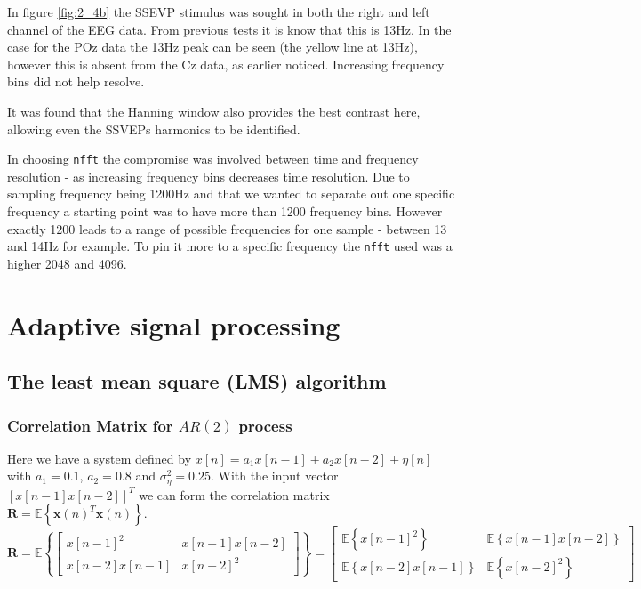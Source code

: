 \documentclass[10pt,twoside,a4paper]{report}
\begin{document}
In figure \ref{fig:2_4b} the SSEVP stimulus was sought in both the right and left channel of the EEG data. From previous tests it is know that this is 13Hz. In the case for the POz data the 13Hz peak can be seen (the yellow line at 13Hz), however this is absent from the Cz data, as earlier noticed. Increasing frequency bins did not help resolve.

It was found that the Hanning window also provides the best contrast here, allowing even the SSVEPs harmonics to be identified.

In choosing \texttt{nfft} the compromise was involved between time and frequency resolution - as increasing frequency bins decreases time resolution. Due to sampling frequency being 1200Hz and that we wanted to separate out one specific frequency a starting point was to have more than 1200 frequency bins. However exactly 1200 leads to a range of possible frequencies for one sample - between 13 and 14Hz for example. To pin it more to a specific frequency the \texttt{nfft} used was a higher 2048 and 4096.
\FloatBarrier
\chapter{Adaptive signal processing}
\section{The least mean square (LMS) algorithm}
\subsection{Correlation Matrix for $AR(2)$ process}


Here we have a system defined by $x[n] = a_1 x[n-1] + a_2 x[n-2] + \eta [n]$ with $a_1 = 0.1$, $a_2 = 0.8$ and $\sigma_\eta^2=0.25$. With the input vector $ \left[ x[n-1]  x[n-2]\right]^T$ we can form the correlation matrix $\mathbf{R} = \mathbb{E}\left\{ \mathbf{x}(n)^T \mathbf{x}(n) \right\}$.
\begin{equation}
\mathbf{R} = \mathbb{E} \left\{ \left[
 \begin{array}{cc}
x[n-1]^2 & x[n-1]x[n-2]  \\
x[n-2]x[n-1] & x[n-2]^2  \end{array}
\right]
\right\}
   =
\left[
    \begin{array}{cc}
  \mathbb{E} \left\{ x[n-1]^2 \right\} & \mathbb{E} \left\{x[n-1]x[n-2] \right\} \\
   \mathbb{E} \left\{ x[n-2]x[n-1]\right\} & \mathbb{E} \left\{x[n-2]^2 \right\} \end{array}
\right]
\end{equation}
\end{document}
